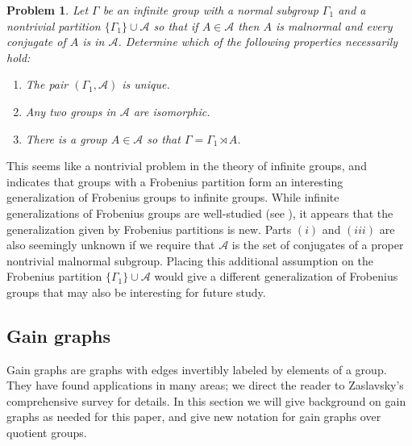 \documentclass[12pt]{article}
\newtheorem{problem}[theorem]{Problem}
\theoremstyle{definition}
\newcommand{\cA}{\mathcal{A}}
\begin{document}
\begin{problem} \label{prob: infinite group partition properties}
Let $\Gamma$ be an infinite group with a normal subgroup $\Gamma_1$ and a nontrivial partition $\{\Gamma_1\} \cup \cA$ so that if $A \in \cA$ then $A$ is malnormal and every conjugate of $A$ is in $\cA$. 
Determine which of the following properties necessarily hold:
\begin{enumerate}[label=$(\roman*)$]

\item The pair $(\Gamma_1, \cA)$ is unique.

\item Any two groups in $\cA$ are isomorphic.

\item There is a group $A \in \cA$ so that $\Gamma = \Gamma_1 \rtimes A$.
\end{enumerate}
\end{problem}

This seems like a nontrivial problem in the theory of infinite groups, and indicates that groups with a Frobenius partition form an interesting generalization of Frobenius groups to infinite groups.
While infinite generalizations of Frobenius groups are well-studied (see \cite{Collins-1990, delaHarpe-Weber-2014, Sozutov-Sunkov-1976}), it appears that the generalization given by Frobenius partitions is new.
Parts $(i)$ and $(iii)$ are also seemingly unknown if we require that $\cA$ is the set of conjugates of a proper nontrivial malnormal subgroup.
Placing this additional assumption on the Frobenius partition $\{\Gamma_1\} \cup \cA$ would give a different generalization of Frobenius groups that may also be interesting for future study.











\subsection{Gain graphs} \label{sec: gain graphs}
Gain graphs are graphs with edges invertibly labeled by elements of a group.
They have found applications in many areas; we direct the reader to Zaslavsky's comprehensive survey \cite{Zaslavsky1998_survey} for details.
In this section we will give background on gain graphs as needed for this paper, and give new notation for gain graphs over quotient groups.
\end{document}
